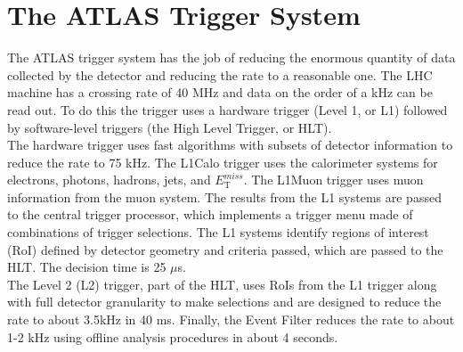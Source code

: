 %

  


\section{The ATLAS Trigger System}

The ATLAS trigger system has the job of reducing the enormous quantity of data collected by the detector and reducing the rate to a reasonable one.  The LHC machine has a crossing rate of 40 MHz and data on the order of a kHz can be read out.  To do this the trigger uses a hardware trigger (Level 1, or L1) followed by software-level triggers (the High Level Trigger, or HLT).  \\

The hardware trigger uses fast algorithms with subsets of detector information to reduce the rate to 75 kHz.  The L1Calo trigger uses the calorimeter systems for electrons, photons, hadrons, jets, and $E_{\mathrm{T}}^{miss}$.  The L1Muon trigger uses muon information from the muon system.  The results from the L1 systems are passed to the central trigger processor, which implements a trigger menu made of combinations of trigger selections.    The L1 systems identify regions of interest (RoI) defined by detector geometry and criteria passed, which are passed to the HLT.  The decision time is 25 $\mu$s. \\

The Level 2 (L2) trigger, part of the HLT, uses RoIs from the L1 trigger along with full detector granularity to make selections and are designed to reduce the rate to about 3.5kHz in 40 ms.  Finally, the Event Filter reduces the rate to about 1-2 kHz using offline analysis procedures in about 4 seconds.  \\




